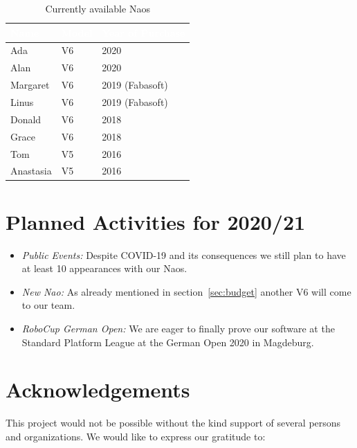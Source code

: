 \documentclass[11pt]{article}
\begin{document}
\begin{table}
\begin{center}
\begin{tabular}{|p{.3\linewidth}|p{.1\linewidth}|p{.2\linewidth}|}
\hline
\cellcolor{gray!100}\textcolor{white}{Name} & \cellcolor{gray!100}\textcolor{white}{Model} & \cellcolor{gray!100}\textcolor{white}{Year of Purchase} \\ \hline
Ada & V6 & 2020 \\ \hline
Alan & V6 & 2020 \\ \hline
Margaret & V6 & 2019 (Fabasoft) \\ \hline
Linus & V6 & 2019 (Fabasoft) \\ \hline
Donald & V6 & 2018 \\ \hline
Grace & V6 & 2018 \\ \hline
Tom & V5 & 2016 \\ \hline
Anastasia & V5 & 2016 \\ \hline
\end{tabular}
\end{center}
\caption{Currently available Naos}
\label{tab:naos}
\end{table}

\section{Planned Activities for 2020/21}

\begin{itemize}
	\item {\em Public Events:}  Despite COVID-19 and its consequences we still plan to have at least 10 appearances with our Naos.
	
	\item {\em New Nao:} As already mentioned in section~\ref{sec:budget} another V6 will come to our team.
		
	\item {\em RoboCup German Open:} We are eager to finally prove our software at the Standard Platform League at the German Open 2020 in Magdeburg.
\end{itemize}

\section{Acknowledgements}
This project would not be possible without the kind support of several persons and organizations. We would like to express our gratitude to:
\end{document}
